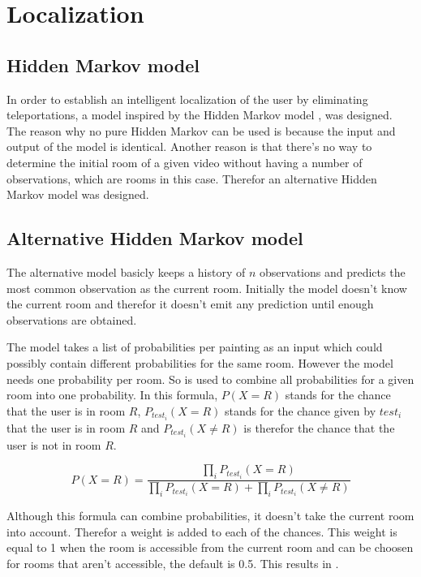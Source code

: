 \section{Localization}
\label{sec:localization}

\subsection{Hidden Markov model}
\label{subsec:hidden-markov}

In order to establish an intelligent localization of the user by eliminating teleportations, a model inspired by the Hidden Markov model \cite{eddy1996hidden}, was designed. The reason why no pure Hidden Markov can be used is because the input and output of the model is identical. Another reason is that there's no way to determine the initial room of a given video without having a number of observations, which are rooms in this case. Therefor an alternative Hidden Markov model was designed.

\subsection{Alternative Hidden Markov model}
\label{subsec:alternative-hidden-markov}

The alternative model basicly keeps a history of $n$ observations and predicts the most common observation as the current room. Initially the model doesn't know the current room and therefor it doesn't emit any prediction until enough observations are obtained.

The model takes a list of probabilities per painting as an input which could possibly contain different probabilities for the same room. However the model needs one probability per room. So  \cite{genest1986combining} is used to combine all probabilities for a given room into one probability. In this formula, $P(X = R)$ stands for the chance that the user is in room $R$, $P_{test_i}(X = R)$ stands for the chance given by $test_i$ that the user is in room $R$ and $P_{test_i}(X \ne R)$ is therefor the chance that the user is not in room $R$.

\begin{equation}
    \label{eq:combine-chances}
    P(X = R) = \frac{\prod_{i} P_{test_i}(X = R)}{\prod_{i} P_{test_i}(X = R) + \prod_{i} P_{test_i}(X \ne R)}
\end{equation}

Although this formula can combine probabilities, it doesn't take the current room into account. Therefor a weight is added to each of the chances. This weight is equal to 1 when the room is accessible from the current room and can be choosen for rooms that aren't accessible, the default is 0.5. This results in .

